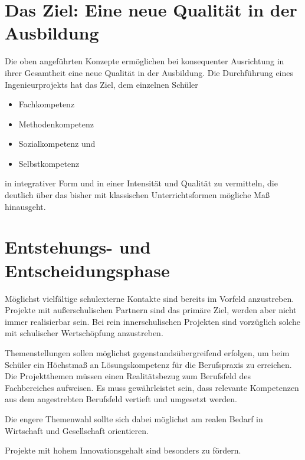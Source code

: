 \section{Das Ziel: Eine neue Qualität in der Ausbildung}

Die oben angeführten Konzepte ermöglichen bei konsequenter Ausrichtung in ihrer Gesamtheit eine neue Qualität in der Ausbildung. Die  Durchführung eines Ingenieurprojekts hat das Ziel, dem einzelnen Schüler 

\begin{itemize}
	\item Fachkompetenz
	\item Methodenkompetenz
	\item Sozialkompetenz und
	\item Selbstkompetenz
\end{itemize}

in integrativer Form und in einer Intensität und Qualität zu vermitteln, die deutlich über das bisher mit klassischen Unterrichtsformen mögliche Maß hinausgeht.

\section{Entstehungs- und Entscheidungsphase}

Möglichst vielfältige schulexterne Kontakte sind bereits im Vorfeld anzustreben. Projekte mit außerschulischen Partnern sind das primäre Ziel, werden aber nicht immer realisierbar sein. Bei rein innerschulischen Projekten sind vorzüglich solche mit schulischer Wertschöpfung anzustreben.

Themenstellungen sollen möglichst gegenstandsübergreifend erfolgen, um beim Schüler ein Höchstmaß an Lösungskompetenz für die Berufspraxis zu erreichen. Die Projektthemen müssen einen Realitätsbezug zum Berufsfeld des Fachbereiches aufweisen. Es muss gewährleistet sein, dass relevante Kompetenzen aus dem angestrebten Berufsfeld vertieft und umgesetzt werden.

Die engere Themenwahl sollte sich dabei möglichst am realen Bedarf in Wirtschaft und Gesellschaft orientieren.

Projekte mit hohem Innovationsgehalt sind besonders zu fördern.

